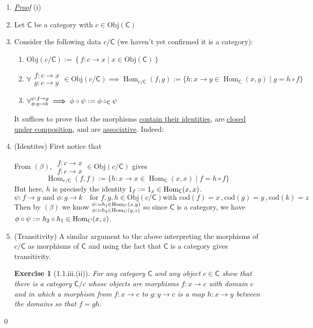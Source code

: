 \documentclass{article}
\theoremstyle{spacious}
\newtheorem*{prm}{Exercise}
\newenvironment{pf}{\begin{enumerate} \item[] \textit{\underline{Proof}} }{\end{enumerate}\qed}
\renewcommand{\:}{\vcentcolon=} %
\DeclareMathOperator{\Hom}{Hom}
\begin{document}
\begin{pf}{(i)}
    \item[] Let \(\mathsf{C}\) be a category with \(c\in\mathrm{Obj}\left(\mathsf{C}\right)\)
    \item[] Consider the following data \(c/\mathsf{C}\) (we haven't yet confirmed it is a category):
    \begin{enumerate}
        \item[$(\alpha)$] \(\mathrm{Obj}\left(c/\mathsf{C}\right):= \left\{f : c \to x \mid x \in \mathrm{Obj}(\mathsf{C})\right\}\) 
        \item[$(\beta)$] 
        \(\forall \substack{f:c\to x\\g:c\to y}\in\mathrm{Obj}\left(c/\mathsf{C}\right)\bm{\implies}\Hom_{c/\mathsf{C}}\left(f,g\right):=\{h : x \to y \in \Hom_{\mathsf{C}}\left(x,y\right)\mid g = h\circ f\}\)
        \item[$(\gamma)$] \(\forall\substack{\psi:f\to g\\\phi:g\to k} \bm{\implies} \phi\circ\psi \:\phi\circ_{\mathsf{C}}\psi\)
    \end{enumerate}
    It suffices to prove that the morphisms \underline{contain their identities}, are \underline{closed under composition}, and are \underline{associative}.  Indeed:
        \item (Identites) First notice that 
        
        From \((\beta)\), \(\substack{f:c\to x\\f:c\to x}\in\mathrm{Obj}\left(c/\mathsf{C}\right)\) gives\[\Hom_{c/\mathsf{C}}\left(f,f\right):=\{h : x \to x \in \Hom_{\mathsf{C}}\left(x,x\right)\mid f = h\circ f\}\]
        But here, \(h\) is precisely the identity \(1_f\:1_x \in \Hom_\mathsf{C}(x,x)\).
        \[\psi:f\to g \text{ and }\phi:g\to k \quad \text{for }f,g,h \in \mathrm{Obj}\left(c/\mathsf{C}\right)
        \text{with }
        \mathrm{cod}\left(f\right)=x\,,
        \mathrm{cod}\left(g\right)=y\,,
        \mathrm{cod}\left(k\right)=z\] 
        Then by \((\beta)\) we know \(\substack{\psi\:h_1\in \Hom_C(x,y)\\\phi\:h_2\in\Hom_C(y,z)}\) so since \(\mathsf{C}\) is a category, we have \(\phi\circ\psi\:h_2\circ h_1 \in \Hom_C(x,z)\).
        \item[] (Transitivity)
        A similar argument to the above interpreting the morphisms of \(c/\mathsf{C}\) as morphisms of \(\mathsf{C}\) and using the fact that \(\mathsf{C}\) is a category gives transitivity.
\begin{prm}[1.1.iii.(ii)]
    For any category \(\mathsf{C}\) and any object \(c\in \mathsf{C}\) show that there is a category \(\mathsf{C}/c\) whose objects are morphisms \(f: x\to c\) with domain \(c\) and in which a morphism from \(f:x \to c\) to \(g:y \to c\) is a map \(h:x\to y\) between the domains so that \(f=gh\).
\end{prm}




\end{pf}
\end{document}
